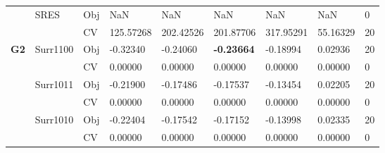 \begin{table*}[!htb]
\begin{tabular}{lllllllll}
		& \multirow{2}{*}{SRES}              & Obj                                & NaN                                & NaN                                & NaN                                  & NaN                                 & NaN                               & 0                \\
		&                                    & CV                                 & 125.57268                          & 202.42526                          & 201.87706                            & 317.95291                           & 55.16329                          & 20               \\ \hline
		\multirow{16}{*}{\textbf{G2}}           & Surr1100                           & Obj                                & -0.32340                           & -0.24060                           & \textbf{-0.23664}                             & -0.18994                            & 0.02936                           & 20               \\
		&                                    & CV                                 & 0.00000                            & 0.00000                            & 0.00000                              & 0.00000                             & 0.00000                           & 0                \\
		& Surr1011                           & Obj                                & -0.21900                           & -0.17486                           & -0.17537                             & -0.13454                            & 0.02205                           & 20               \\
		&                                    & CV                                 & 0.00000                            & 0.00000                            & 0.00000                              & 0.00000                             & 0.00000                           & 0                \\
		& Surr1010                           & Obj                                & -0.22404                           & -0.17542                           & -0.17152                             & -0.13998                            & 0.02335                           & 20               \\
		&                                    & CV                                 & 0.00000                            & 0.00000                            & 0.00000                              & 0.00000                             & 0.00000                           & 0                \\

\end{tabular}
\end{table*}
